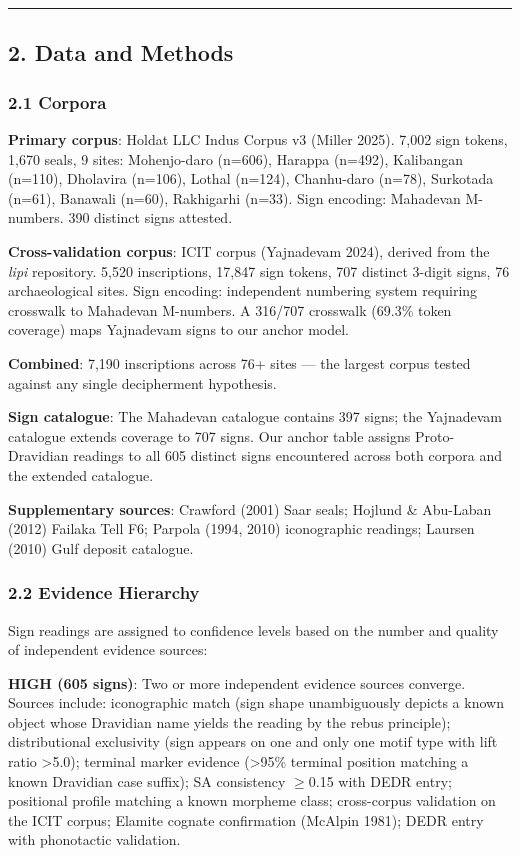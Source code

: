 \documentclass[
  11pt,
]{article}
\begin{document}
\begin{center}\rule{0.5\linewidth}{0.5pt}\end{center}

\subsection{2. Data and Methods}\label{data-and-methods}

\subsubsection{2.1 Corpora}\label{corpora}

\textbf{Primary corpus}: Holdat LLC Indus Corpus v3 (Miller 2025). 7,002
sign tokens, 1,670 seals, 9 sites: Mohenjo-daro (n=606), Harappa
(n=492), Kalibangan (n=110), Dholavira (n=106), Lothal (n=124),
Chanhu-daro (n=78), Surkotada (n=61), Banawali (n=60), Rakhigarhi
(n=33). Sign encoding: Mahadevan M-numbers. 390 distinct signs attested.

\textbf{Cross-validation corpus}: ICIT corpus (Yajnadevam 2024),
derived from the \emph{lipi} repository. 5,520 inscriptions, 17,847 sign
tokens, 707 distinct 3-digit signs, 76 archaeological sites. Sign
encoding: independent numbering system requiring crosswalk to Mahadevan
M-numbers. A 316/707 crosswalk (69.3\% token coverage) maps Yajnadevam
signs to our anchor model.

\textbf{Combined}: 7,190 inscriptions across 76+ sites --- the largest
corpus tested against any single decipherment hypothesis.

\textbf{Sign catalogue}: The Mahadevan catalogue contains 397 signs; the
Yajnadevam catalogue extends coverage to 707 signs. Our anchor table
assigns Proto-Dravidian readings to all 605 distinct signs encountered
across both corpora and the extended catalogue.

\textbf{Supplementary sources}: Crawford (2001) Saar seals; Hojlund \&
Abu-Laban (2012) Failaka Tell F6; Parpola (1994, 2010) iconographic
readings; Laursen (2010) Gulf deposit catalogue.

\subsubsection{2.2 Evidence Hierarchy}\label{evidence-hierarchy}

Sign readings are assigned to confidence levels based on the number and
quality of independent evidence sources:

\textbf{HIGH (605 signs)}: Two or more independent evidence sources
converge. Sources include: iconographic match (sign shape unambiguously
depicts a known object whose Dravidian name yields the reading by the
rebus principle); distributional exclusivity (sign appears on one and
only one motif type with lift ratio \textgreater5.0); terminal marker
evidence (\textgreater95\% terminal position matching a known Dravidian
case suffix); SA consistency $\geq$0.15 with DEDR entry; positional profile
matching a known morpheme class; cross-corpus validation on the
ICIT corpus; Elamite cognate confirmation (McAlpin 1981); DEDR
entry with phonotactic validation.
\end{document}
